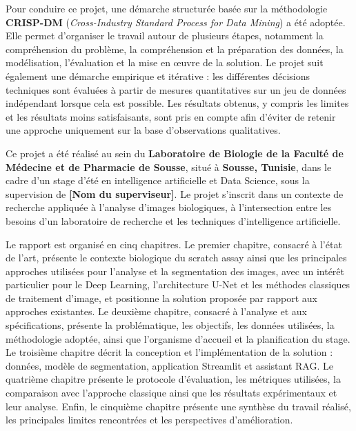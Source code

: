 \documentclass[12pt,a4paper]{report}
\begin{document}
\vspace{0.3cm}
\noindent
\hspace{1cm}Pour conduire ce projet, une démarche structurée basée sur la méthodologie \textbf{CRISP-DM} (\textit{Cross-Industry Standard Process for Data Mining}) a été adoptée. Elle permet d'organiser le travail autour de plusieurs étapes, notamment la compréhension du problème, la compréhension et la préparation des données, la modélisation, l'évaluation et la mise en \oe uvre de la solution. Le projet suit également une démarche empirique et itérative : les différentes décisions techniques sont évaluées à partir de mesures quantitatives sur un jeu de données indépendant lorsque cela est possible. Les résultats obtenus, y compris les limites et les résultats moins satisfaisants, sont pris en compte afin d'éviter de retenir une approche uniquement sur la base d'observations qualitatives.

\vspace{0.3cm}
\noindent
\hspace{1cm}Ce projet a été réalisé au sein du \textbf{Laboratoire de Biologie de la Faculté de Médecine et de Pharmacie de Sousse}, situé à \textbf{Sousse, Tunisie}, dans le cadre d'un stage d'été en intelligence artificielle et Data Science, sous la supervision de \textbf{[Nom du superviseur]}. Le projet s'inscrit dans un contexte de recherche appliquée à l'analyse d'images biologiques, à l'intersection entre les besoins d'un laboratoire de recherche et les techniques d'intelligence artificielle.

\vspace{0.3cm}
\noindent
\hspace{1cm}Le rapport est organisé en cinq chapitres. Le premier chapitre, consacré à l'état de l'art, présente le contexte biologique du scratch assay ainsi que les principales approches utilisées pour l'analyse et la segmentation des images, avec un intérêt particulier pour le Deep Learning, l'architecture U-Net et les méthodes classiques de traitement d'image, et positionne la solution proposée par rapport aux approches existantes. Le deuxième chapitre, consacré à l'analyse et aux spécifications, présente la problématique, les objectifs, les données utilisées, la méthodologie adoptée, ainsi que l'organisme d'accueil et la planification du stage. Le troisième chapitre décrit la conception et l'implémentation de la solution : données, modèle de segmentation, application Streamlit et assistant RAG. Le quatrième chapitre présente le protocole d'évaluation, les métriques utilisées, la comparaison avec l'approche classique ainsi que les résultats expérimentaux et leur analyse. Enfin, le cinquième chapitre présente une synthèse du travail réalisé, les principales limites rencontrées et les perspectives d'amélioration.
\end{document}

